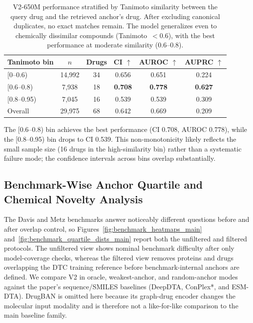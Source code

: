 \begin{table}[t]
\centering
\caption{V2-650M performance stratified by Tanimoto similarity between the query drug and the retrieved anchor's drug. After excluding canonical duplicates, no exact matches remain. The model generalizes even to chemically dissimilar compounds (Tanimoto~$< 0.6$), with the best performance at moderate similarity (0.6--0.8).}
\label{tab:tanimoto_strat}
\small
\begin{tabular}{lccccc}
\toprule
Tanimoto bin & $n$ & Drugs & CI $\uparrow$ & AUROC $\uparrow$ & AUPRC $\uparrow$ \\
\midrule
{[0--0.6)}   & 14,992 & 34 & 0.656 & 0.651 & 0.224 \\
{[0.6--0.8)} & 7,938  & 18 & \textbf{0.708} & \textbf{0.778} & \textbf{0.627} \\
{[0.8--0.95)} & 7,045 & 16 & 0.539 & 0.539 & 0.309 \\
\midrule
Overall      & 29,975 & 68 & 0.642 & 0.669 & 0.209 \\
\bottomrule
\end{tabular}
\end{table}

The [0.6--0.8) bin achieves the best performance (CI 0.708, AUROC 0.778), while the [0.8--0.95) bin drops to CI 0.539. This non-monotonicity likely reflects the small sample size (16 drugs in the high-similarity bin) rather than a systematic failure mode; the confidence intervals across bins overlap substantially.

\subsection{Benchmark-Wise Anchor Quartile and Chemical Novelty Analysis}
\label{sec:benchmark_heatmaps}

The Davis and Metz benchmarks answer noticeably different questions before and after overlap control, so Figures~\ref{fig:benchmark_heatmaps_main} and~\ref{fig:benchmark_quartile_dists_main} report both the unfiltered and filtered protocols. The unfiltered view shows nominal benchmark difficulty after only model-coverage checks, whereas the filtered view removes proteins and drugs overlapping the DTC training reference before benchmark-internal anchors are defined. We compare V2 in oracle, weakest-anchor, and random-anchor modes against the paper's sequence/SMILES baselines (DeepDTA, ConPlex*, and ESM-DTA). DrugBAN is omitted here because its graph-drug encoder changes the molecular input modality and is therefore not a like-for-like comparison to the main baseline family.


